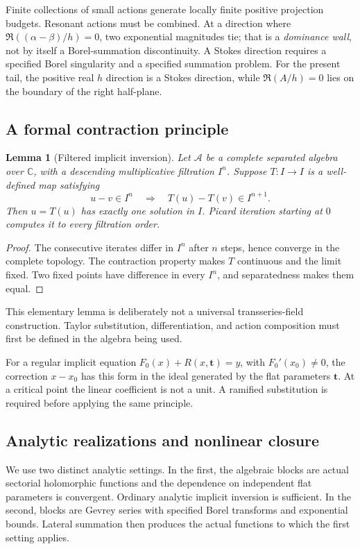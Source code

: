 \documentclass[11pt,a4paper]{article}
\numberwithin{equation}{section}
\newtheorem{lemma}[theorem]{Lemma}
\theoremstyle{definition}
\theoremstyle{remark}\newtheorem{remark}[theorem]{Remark}
\newcommand{\C}{\mathbb C}\newcommand{\R}{\mathbb R}
\begin{document}
Finite collections of small actions generate locally finite positive
projection budgets. Resonant actions must be combined. At a direction
where $\Re((\alpha-\beta)/h)=0$, two exponential magnitudes tie; that is a
\emph{dominance wall}, not by itself a Borel-summation discontinuity. A
Stokes direction requires a specified Borel singularity and a specified
summation problem. For the present tail, the positive real $h$ direction
is a Stokes direction, while $\Re(A/h)=0$ lies on the boundary of the
right half-plane.

\subsection{A formal contraction principle}
\begin{lemma}[Filtered implicit inversion]\label{lem:filtered}
Let $\mathcal A$ be a complete separated algebra over $\C$, with a
descending multiplicative filtration $I^n$. Suppose $T:I\to I$ is a
well-defined map satisfying
\[
 u-v\in I^n\quad\Longrightarrow\quad T(u)-T(v)\in I^{n+1}.
\]
Then $u=T(u)$ has exactly one solution in $I$. Picard iteration starting
at $0$ computes it to every filtration order.
\end{lemma}
\begin{proof}
The consecutive iterates differ in $I^n$ after $n$ steps, hence converge
in the complete topology. The contraction property makes $T$ continuous
and the limit fixed. Two fixed points have difference in every $I^n$,
and separatedness makes them equal.
\end{proof}
This elementary lemma is deliberately not a universal transseries-field
construction. Taylor substitution, differentiation, and action
composition must first be defined in the algebra being used.

For a regular implicit equation
$F_0(x)+R(x,\mathbf t)=y$, with $F_0'(x_0)\ne0$, the correction
$x-x_0$ has this form in the ideal generated by the flat parameters
$\mathbf t$. At a critical point the linear coefficient is not a unit.
A ramified substitution is required before applying the same principle.

\subsection{Analytic realizations and nonlinear closure}
We use two distinct analytic settings. In the first, the algebraic
blocks are actual sectorial holomorphic functions and the dependence on
independent flat parameters is convergent. Ordinary analytic implicit
inversion is sufficient. In the second, blocks are Gevrey series with
specified Borel transforms and exponential bounds. Lateral summation
then produces the actual functions to which the first setting applies.
\end{document}
